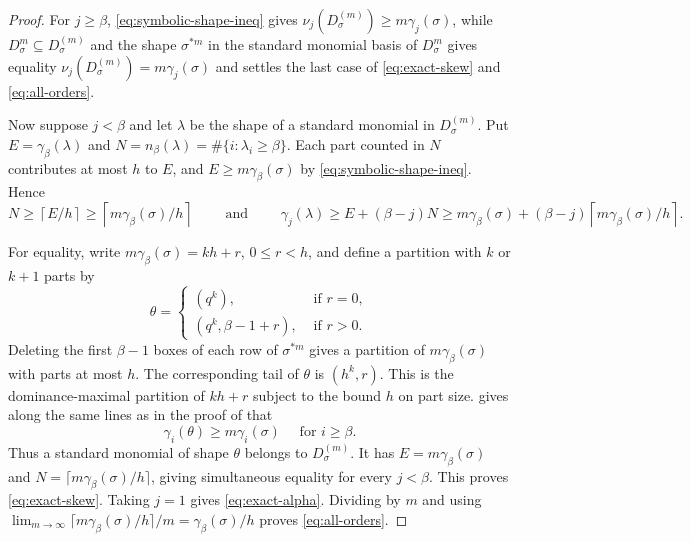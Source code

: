 \documentclass[11pt,reqno]{amsart}
\numberwithin{equation}{subsection}
\theoremstyle{definition}
\theoremstyle{remark}
\renewcommand{\l}{\lambda}
\begin{document}
\begin{proof}
For $j\ge\beta$, \eqref{eq:symbolic-shape-ineq} gives
$\nu_j(D_\sigma^{(m)})\ge m\gamma_j(\sigma)$, while
$D_\sigma^m\subseteq D_\sigma^{(m)}$ and the shape $\sigma^{*m}$ in the standard monomial basis of  $D_\sigma^m$ gives
equality $\nu_j(D_\sigma^{(m)})= m\gamma_j(\sigma)$ and settles the last case of  \eqref{eq:exact-skew} and \eqref{eq:all-orders}.

Now suppose $j<\beta$ and let $\lambda$ be the shape of a standard monomial in $D_\sigma^{(m)}$. Put $E=\gamma_\beta(\l)$ and 
 $N=n_\beta(\lambda)=\#\{i:\lambda_i\geq \beta\}$. Each part counted
in $N$ contributes at most $h$ to $E$, and $E\ge m\gamma_\beta(\sigma)$ by  \eqref{eq:symbolic-shape-ineq}. Hence
\[
 N\ge\left\lceil E/h\right\rceil\ge\left\lceil m\gamma_\beta(\sigma)/h\right\rceil
 \qquad \text{ and }  \qquad
 \gamma_j(\lambda)\ge E+(\beta-j)N
 \ge m\gamma_\beta(\sigma)+(\beta-j)\left\lceil m\gamma_\beta(\sigma)/h\right\rceil.
\]

For equality, write $m\gamma_\beta(\sigma)=kh+r$, $0\le r<h$, and define a partition with $k$ or $k+1$ parts %
by
\begin{equation}\label{eq:extremal-shape}
 \theta=
 \begin{cases}
 (q^k),& \text{ if }r=0,\\
 (q^k,\beta-1+r),&  \text{ if } r>0.
 \end{cases}
\end{equation}
% 
Deleting the first $\beta-1$ boxes of each row of $\sigma^{*m}$ gives
a partition of $m\gamma_\beta(\sigma)$ with parts at most $h$. The corresponding tail
of $\theta$ is $(h^k,r)$. This is
the dominance-maximal partition of $kh+r$ subject to the bound
$h$ on part size.   gives along the same lines as in the proof of  that
\[
 \gamma_i(\theta)\ge m\gamma_i(\sigma)\quad \text{ for } i\ge\beta.
\]
Thus a standard monomial of shape $\theta$ belongs to
$D_\sigma^{(m)}$. It has $E=m\gamma_\beta(\sigma)$ and $N=\lceil m\gamma_\beta(\sigma)/h\rceil$, giving
simultaneous equality for every $j<\beta$. This proves
\eqref{eq:exact-skew}. Taking $j=1$ gives \eqref{eq:exact-alpha}. Dividing by $m$
and using $\lim_{m\to \infty}\lceil m\gamma_\beta(\sigma)/h\rceil/m= \gamma_\beta(\sigma)/h$ proves
\eqref{eq:all-orders}.
\end{proof}
\end{document}
